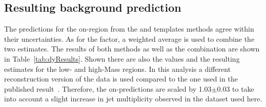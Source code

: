 \subsection{Resulting background prediction}
The predictions for the on-\Z region from the \JZB and \MET templates methods agree within their uncertainties. As for the \Rsfof factor, a weighted average is used to combine the two estimates. The results of both methods as well as the combination are shown in Table~\ref{tab:dyResults}. Shown there are also the \Routin values and the resulting estimates for the low- and high-Mass regions. In this analysis a different reconstruction version of the data is used compared to the one used in the published result~\cite{Khachatryan:2015lwa}. Therefore, the on-\Z predictions are scaled by 1.03$\pm$0.03 to take into account a slight increase in jet multiplicity observed in the dataset used here.




